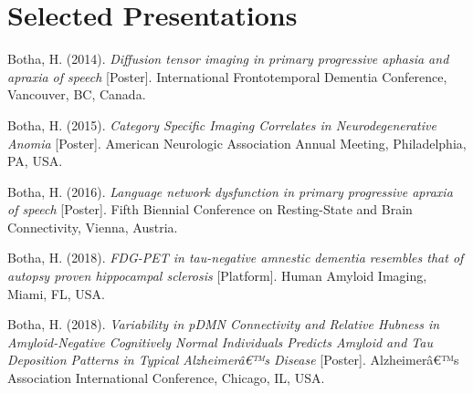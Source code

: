 \documentclass[11pt, a4paper]{awesome-cv}
\begin{document}
\begin{cventries}
    \vspace{-4.0mm}
    \vspace{-4.0mm}
    \vspace{-4.0mm}
    \vspace{-4.0mm}
\end{cventries}

\hypertarget{selected-presentations}{%
\section{Selected Presentations}\label{selected-presentations}}

\hypertarget{bibliography}{}
\leavevmode\hypertarget{ref-Botha_FTD_2014}{}%
Botha, H. (2014). \emph{Diffusion tensor imaging in primary progressive
aphasia and apraxia of speech} {[}Poster{]}. International
Frontotemporal Dementia Conference, Vancouver, BC, Canada.

\leavevmode\hypertarget{ref-Botha_ANA_2015}{}%
Botha, H. (2015). \emph{Category Specific Imaging Correlates in
Neurodegenerative Anomia} {[}Poster{]}. American Neurologic Association
Annual Meeting, Philadelphia, PA, USA.

\leavevmode\hypertarget{ref-Botha_REST_2016}{}%
Botha, H. (2016). \emph{Language network dysfunction in primary
progressive apraxia of speech} {[}Poster{]}. Fifth Biennial Conference
on Resting-State and Brain Connectivity, Vienna, Austria.

\leavevmode\hypertarget{ref-Botha_HAI_2018}{}%
Botha, H. (2018). \emph{FDG-PET in tau-negative amnestic dementia
resembles that of autopsy proven hippocampal sclerosis} {[}Platform{]}.
Human Amyloid Imaging, Miami, FL, USA.

\leavevmode\hypertarget{ref-Botha_AIC_2018}{}%
Botha, H. (2018). \emph{Variability in pDMN Connectivity and Relative
Hubness in Amyloid-Negative Cognitively Normal Individuals Predicts
Amyloid and Tau Deposition Patterns in Typical Alzheimerâ€™s Disease}
{[}Poster{]}. Alzheimerâ€™s Association International Conference,
Chicago, IL, USA.
\end{document}
